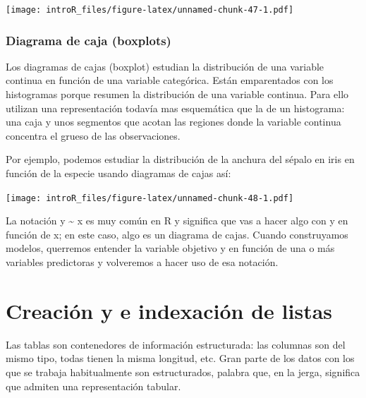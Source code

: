 \documentclass[
]{book}
\newenvironment{Shaded}{\begin{snugshade}}{\end{snugshade}}
\newcommand{\CharTok}[1]{\textcolor[rgb]{0.31,0.60,0.02}{#1}}
\newcommand{\DataTypeTok}[1]{\textcolor[rgb]{0.13,0.29,0.53}{#1}}
\newcommand{\KeywordTok}[1]{\textcolor[rgb]{0.13,0.29,0.53}{\textbf{#1}}}
\newcommand{\NormalTok}[1]{#1}
\newcommand{\OperatorTok}[1]{\textcolor[rgb]{0.81,0.36,0.00}{\textbf{#1}}}
\newcommand{\StringTok}[1]{\textcolor[rgb]{0.31,0.60,0.02}{#1}}
\begin{document}
\texttt{[image: introR\_files/figure-latex/unnamed-chunk-47-1.pdf]}

\hypertarget{diagrama-de-caja-boxplots}{%
\subsection{Diagrama de caja (boxplots)}\label{diagrama-de-caja-boxplots}}

Los diagramas de cajas (boxplot) estudian la distribución de una variable continua en función de una variable categórica. Están emparentados con los histogramas porque resumen la distribución de una variable continua. Para ello utilizan una representación todavía mas esquemática que la de un histograma: una caja y unos segmentos que acotan las regiones donde la variable continua concentra el grueso de las observaciones.

Por ejemplo, podemos estudiar la distribución de la anchura del sépalo en iris en función de la especie usando diagramas de cajas así:

\begin{Shaded}
\end{Shaded}

\texttt{[image: introR\_files/figure-latex/unnamed-chunk-48-1.pdf]}

La notación y \textasciitilde{} x es muy común en R y significa que vas a hacer algo con y en función de x; en este caso, algo es un diagrama de cajas. Cuando construyamos modelos, querremos entender la variable objetivo y en función de una o más variables predictoras y volveremos a hacer uso de esa notación.

\hypertarget{creaciuxf3n-y-e-indexaciuxf3n-de-listas}{%
\chapter{Creación y e indexación de listas}\label{creaciuxf3n-y-e-indexaciuxf3n-de-listas}}

Las tablas son contenedores de información estructurada: las columnas son del mismo tipo, todas tienen la misma longitud, etc. Gran parte de los datos con los que se trabaja habitualmente son estructurados, palabra que, en la jerga, significa que admiten una representación tabular.
\end{document}
